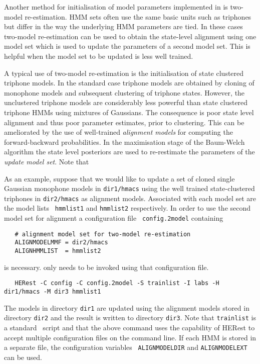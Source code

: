 
Another method for initialisation of model parameters implemented in
 is two-model re-estimation. HMM sets often use the same
basic units such as triphones but differ in the way the underlying HMM
parameters are tied. In these cases two-model re-estimation can be
used to obtain the state-level alignment using one model set which is
used to update the parameters of a second model set. This is helpful
when the model set to be updated is less well trained.

A typical use of two-model re-estimation is the initialisation of state clustered triphone
models. In the standard case triphone models are obtained by cloning
of monophone models and subsequent clustering of triphone states.
However, the unclustered triphone models are considerably less
powerful than state clustered triphone HMMs using mixtures of
Gaussians. The consequence is poor state level alignment and thus poor
parameter estimates, prior to clustering.  This can be ameliorated by
the use of well-trained \textit{alignment models} for computing the
forward-backward probabilities. In the maximisation stage of the
Baum-Welch algorithm the state level posteriors are used to
re-restimate the parameters of the \textit{update model set}. Note
that

As an example, suppose that we would like to update a set of cloned
single Gaussian monophone models in {\tt dir1/hmacs} using the well
trained state-clustered triphones in {\tt dir2/hmacs} as alignment
models. Associated with each model set are the model lists {\tt
  hmmlist1} and {\tt hmmlist2} respectively. In order to use the
second model set for alignment a configuration file {\tt
  config.2model} containing
\begin{verbatim}
   # alignment model set for two-model re-estimation
   ALIGNMODELMMF = dir2/hmacs
   ALIGNHMMLIST  = hmmlist2
\end{verbatim}
is necessary.  only needs to be invoked using that
configuration file.
\begin{verbatim}
   HERest -C config -C config.2model -S trainlist -I labs -H dir1/hmacs -M dir3 hmmlist1
\end{verbatim}
The models in directory {\tt dir1} are updated using the alignment
models stored in directory {\tt dir2} and the result is written to
directory {\tt dir3}. Note that {\tt trainlist} is a standard \HTK\ 
script and that the above command uses the capability of HERest to
accept multiple configuration files on the command line. If each HMM
is stored in a separate file, the configuration variables {\tt
  ALIGNMODELDIR} and {\tt ALIGNMODELEXT} can be used.

